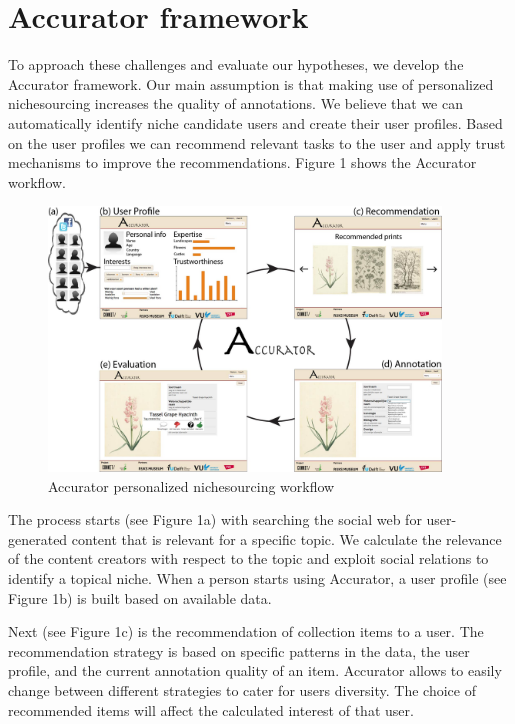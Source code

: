 \section{Accurator framework}
\label{architecture}
To approach these challenges and evaluate our hypotheses, we develop the Accurator framework. Our main assumption is that making use of personalized nichesourcing increases the quality of annotations. We believe that we can automatically identify niche candidate users and create their user profiles. Based on the user profiles we can recommend relevant tasks to the user and apply trust mechanisms to improve the recommendations. Figure 1 shows the Accurator workflow. 

\begin{figure}[hbt]
	\centering
	\includegraphics[width=0.93\textwidth]{accurator_diagram.jpg}
  	\caption{Accurator personalized nichesourcing workflow}
\end{figure}

The process starts (see Figure 1a) with searching the social web for user-generated content that is relevant for a specific topic. We calculate the relevance of the content creators with respect to the topic and exploit social relations to identify a topical niche. When a person starts using Accurator, a user profile (see Figure 1b) is built based on available data.

Next (see Figure 1c) is the recommendation of collection items to a user. The recommendation strategy is based on specific patterns in the data, the user profile, and the current annotation quality of an item. Accurator allows to easily change between different strategies to cater for users diversity.
The choice of recommended items will affect the calculated interest of that user.

